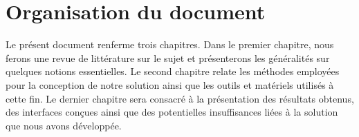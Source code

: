 \thispagestyle{plain} %

\section*{Organisation du document}
Le présent document renferme trois chapitres. 
Dans le premier chapitre, nous ferons une revue de littérature sur le sujet 
et présenterons les généralités sur quelques notions essentielles. 
Le second chapitre relate les méthodes employées pour la conception de notre solution ainsi 
que les outils et matériels utilisés à cette fin. 
Le dernier chapitre sera consacré à la présentation des résultats obtenus, 
des interfaces conçues ainsi que des potentielles insuffisances liées à la solution que nous avons développée.
